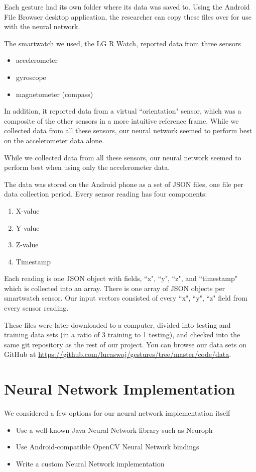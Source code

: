 \documentclass{report}
\begin{document}
Each gesture had its own folder where its data was saved to. Using the Android File Browser desktop application, the researcher can copy these files over for use with the neural network.

The smartwatch we used, the LG R Watch, reported data from three sensors
\begin{itemize}
\item accelerometer
\item gyroscope
\item magnetometer (compass)
\end{itemize}
In addition, it reported data from a virtual ``orientation" sensor, which was a composite of the other sensors in a more intuitive reference frame. While we collected data from all these sensors, our neural network seemed to perform best on the accelerometer data alone.

While we collected data from all these sensors, our neural network seemed to perform best when using only the accelerometer data.

The data was stored on the Android phone as a set of JSON files, one file per data collection period. Every sensor reading has four components:

\begin{enumerate}
\item X-value
\item Y-value
\item Z-value
\item Timestamp
\end{enumerate}

Each reading is one JSON object with fields, ``x", ``y", ``z", and ``timestamp" which is collected into an array. There is one array of JSON objects per smartwatch sensor. Our input vectors consisted of every ``x", ``y", ``z" field from every sensor reading.

These files were later downloaded to a computer, divided into testing and training data sets (in a ratio of 3 training to 1 testing), and checked into the same git repository as the rest of our project. You can browse our data sets on GitHub at \url{https://github.com/lucaswoj/gestures/tree/master/code/data}.

\section{Neural Network Implementation}

We considered a few options for our neural network implementation itself
\begin{itemize}
\item Use a well-known Java Neural Network library such as Neuroph
\item Use Android-compatible OpenCV Neural Network bindings
\item Write a custom Neural Network implementation
\end{itemize}
\end{document}
